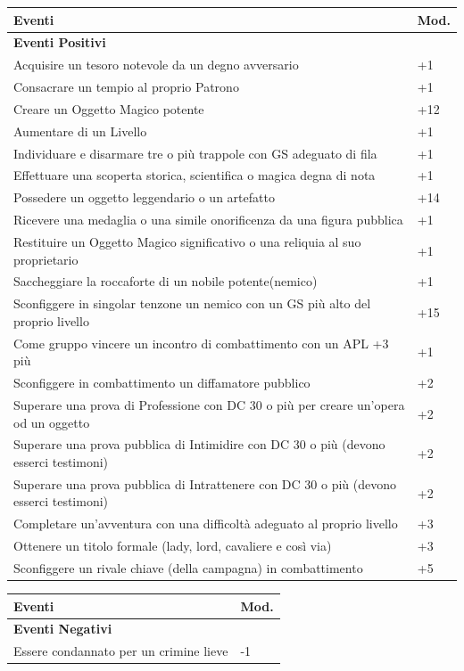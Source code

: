 \documentclass[a4paper,twoside,openany]{book}
\begin{document}
\begin{multicols}{2}
\noindent\begin{tabularx}{0.48\textwidth}{Xl}
\textbf{Eventi}&\textbf{Mod.}\\
\toprule
\textbf{Eventi Positivi}&\\
Acquisire un tesoro notevole da un degno avversario&+1\\
Consacrare un tempio al proprio Patrono&+1\\
Creare un Oggetto Magico potente&+12\\
Aumentare di un Livello&+1\\
Individuare e disarmare tre o più trappole con GS adeguato di fila&+1\\
Effettuare una scoperta storica, scientifica o magica degna di nota&+1\\
Possedere un oggetto leggendario o un artefatto&+14\\
Ricevere una medaglia o una simile onorificenza da una figura pubblica&+1\\
Restituire un Oggetto Magico significativo o una reliquia al suo proprietario&+1\\
Saccheggiare la roccaforte di un nobile potente(nemico)&+1\\
Sconfiggere in singolar tenzone un nemico con un GS più alto del proprio livello&+15\\
Come gruppo vincere un incontro di combattimento con un APL +3 più&+1\\
Sconfiggere in combattimento un diffamatore pubblico&+2\\
Superare una prova di Professione con DC 30 o più per creare un'opera od un oggetto &+2\\
Superare una prova pubblica di Intimidire con DC 30 o più (devono esserci testimoni)&+2\\
Superare una prova pubblica di Intrattenere con DC 30 o più (devono esserci testimoni)&+2\\
Completare un'avventura con una difficoltà adeguato al proprio livello&+3\\
Ottenere un titolo formale (lady, lord, cavaliere e così via)&+3\\
Sconfiggere un rivale chiave (della campagna) in combattimento&+5
\end{tabularx}
\noindent\begin{tabularx}{0.48\textwidth}{Xl}
	\textbf{Eventi}&\textbf{Mod.}\\
	\toprule
\textbf{Eventi Negativi}&\\
Essere condannato per un crimine lieve&-1\\

\end{tabularx}
\end{multicols}
\end{document}
